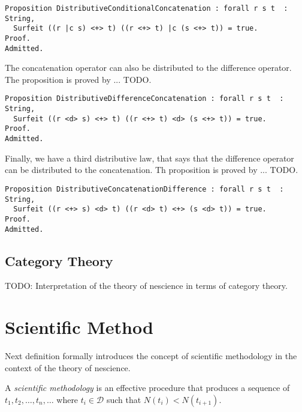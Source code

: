 \begin{sourcecode}
{\scriptsize \begin{verbatim}
Proposition DistributiveConditionalConcatenation : forall r s t  : String,
  Surfeit ((r |c s) <+> t) ((r <+> t) |c (s <+> t)) = true.
Proof.
Admitted.
\end{verbatim}}
\end{sourcecode}

The concatenation operator can also be distributed to the difference operator. The proposition is proved by ... {\color{red} TODO}.

\begin{sourcecode}
{\scriptsize \begin{verbatim}
Proposition DistributiveDifferenceConcatenation : forall r s t  : String,
  Surfeit ((r <d> s) <+> t) ((r <+> t) <d> (s <+> t)) = true.
Proof.
Admitted.
\end{verbatim}}
\end{sourcecode}

Finally, we have a third distributive law, that says that the difference operator can be distributed to the concatenation. Th proposition is proved by ... {\color{red} TODO}.

\begin{sourcecode}
{\scriptsize \begin{verbatim}
Proposition DistributiveConcatenationDifference : forall r s t  : String,
  Surfeit ((r <+> s) <d> t) ((r <d> t) <+> (s <d> t)) = true.
Proof.
Admitted.
\end{verbatim}}
\end{sourcecode}


%
%

\subsection{Category Theory}

{\color{red} TODO: Interpretation of the theory of nescience in terms of category theory.}


%
%

\section{Scientific Method}

Next definition formally introduces the concept of scientific methodology in the context of the theory of nescience.

\begin{definition}
A \emph{scientific methodology} is an effective procedure that produces a sequence of $t_1, t_2, \ldots, t_n, \ldots$ where $t_i \in \mathcal{D}$ such that $N(t_i) < N(t_{i+1})$.
\end{definition}

